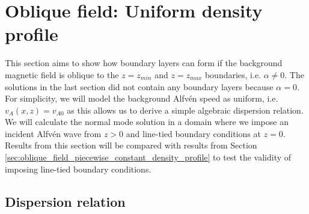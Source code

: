 \section{Oblique field: Uniform density profile}
\label{sec:oblique_field_uniform_density_profile_with_line_tied_bcs}

This section aims to show how boundary layers can form if the background magnetic field is oblique to the $z=z_{min}$ and $z=z_{max}$ boundaries, i.e. $\alpha\ne0$. The solutions in the last section did not contain any boundary layers because $\alpha=0$. For simplicity, we will model the background Alfv\'en speed as uniform, i.e. $v_A(x,z)=v_{A0}$ as this allows us to derive a simple algebraic dispersion relation. We will calculate the normal mode solution in a domain where we impose an incident Alfv\'en wave from $z>0$ and line-tied boundary conditions at $z=0$. Results from this section will be compared with results from Section \ref{sec:oblique_field_piecewise_constant_density_profile} to test the validity of imposing line-tied boundary conditions.

\subsection{Dispersion relation}

